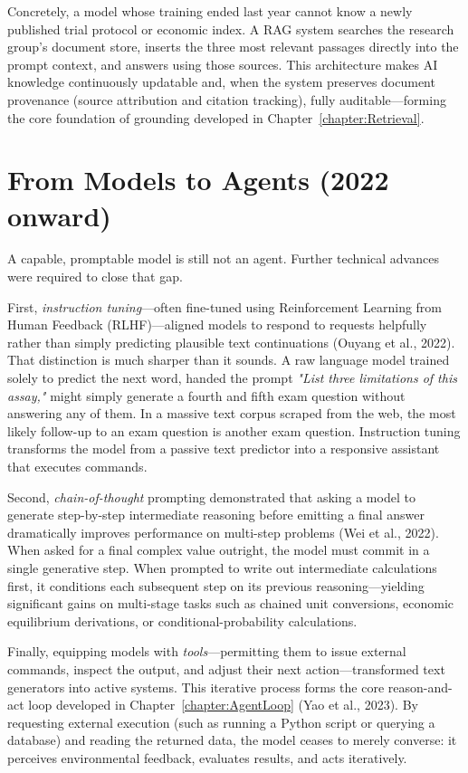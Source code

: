 Concretely, a model whose training ended last year cannot know a newly published trial protocol or economic index.
A RAG system searches the research group's document store, inserts the three most relevant passages directly into the prompt context, and answers using those sources.
This architecture makes AI knowledge continuously updatable and, when the system preserves document provenance (source attribution and citation tracking), fully auditable—forming the core foundation of grounding developed in Chapter~\ref{chapter:Retrieval}.


\section{From Models to Agents (2022 onward)}
\label{section:FromModelsToAgents}

A capable, promptable model is still not an agent.
Further technical advances were required to close that gap.

First, \emph{instruction tuning}—often fine-tuned using Reinforcement Learning from Human Feedback (RLHF)—aligned models to respond to requests helpfully rather than simply predicting plausible text continuations (Ouyang et al., 2022).
That distinction is much sharper than it sounds.
A raw language model trained solely to predict the next word, handed the prompt \emph{"List three limitations of this assay,"} might simply generate a fourth and fifth exam question without answering any of them.
In a massive text corpus scraped from the web, the most likely follow-up to an exam question is another exam question.
Instruction tuning transforms the model from a passive text predictor into a responsive assistant that executes commands.

Second, \emph{chain-of-thought} prompting demonstrated that asking a model to generate step-by-step intermediate reasoning before emitting a final answer dramatically improves performance on multi-step problems (Wei et al., 2022).
When asked for a final complex value outright, the model must commit in a single generative step.
When prompted to write out intermediate calculations first, it conditions each subsequent step on its previous reasoning—yielding significant gains on multi-stage tasks such as chained unit conversions, economic equilibrium derivations, or conditional-probability calculations.

Finally, equipping models with \emph{tools}—permitting them to issue external commands, inspect the output, and adjust their next action—transformed text generators into active systems.
This iterative process forms the core reason-and-act loop developed in Chapter~\ref{chapter:AgentLoop} (Yao et al., 2023).
By requesting external execution (such as running a Python script or querying a database) and reading the returned data, the model ceases to merely converse: it perceives environmental feedback, evaluates results, and acts iteratively.

